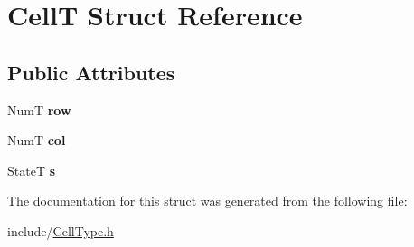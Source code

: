 \hypertarget{struct_cell_t}{}\section{CellT Struct Reference}
\label{struct_cell_t}
\subsection*{Public Attributes}
\begin{DoxyCompactItemize}
\item 
NumT {\bfseries row}\hypertarget{struct_cell_t_a0a541f36dce310ab269530b6321c0fb8}{}\label{struct_cell_t_a0a541f36dce310ab269530b6321c0fb8}

\item 
NumT {\bfseries col}\hypertarget{struct_cell_t_aacc819e93ede6dfb667fb256a9fce9ca}{}\label{struct_cell_t_aacc819e93ede6dfb667fb256a9fce9ca}

\item 
StateT {\bfseries s}\hypertarget{struct_cell_t_a8c0cc4933564a7df88408385f96aca78}{}\label{struct_cell_t_a8c0cc4933564a7df88408385f96aca78}

\end{DoxyCompactItemize}


The documentation for this struct was generated from the following file\+:\begin{DoxyCompactItemize}
\item 
include/\hyperlink{_cell_type_8h}{Cell\+Type.\+h}\end{DoxyCompactItemize}
